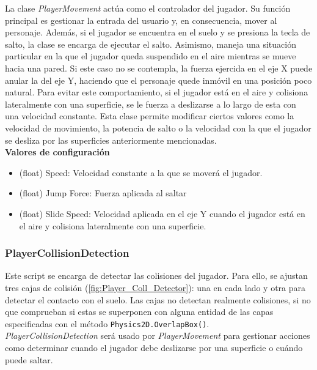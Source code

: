 La clase \textit{PlayerMovement} actúa como el controlador del jugador. Su función principal es gestionar la entrada del usuario y, en consecuencia, mover al personaje. Además, si el jugador se encuentra en el suelo y se presiona la tecla de salto, la clase se encarga de ejecutar el salto.
Asimismo, maneja una situación particular en la que el jugador queda suspendido en el aire mientras se mueve hacia una pared. Si este caso no se contempla, la fuerza ejercida en el eje X puede anular la del eje Y, haciendo que el personaje quede inmóvil en una posición poco natural. Para evitar este comportamiento, si el jugador está en el aire y colisiona lateralmente con una superficie, se le fuerza a deslizarse a lo largo de esta con una velocidad constante.
Esta clase permite modificar ciertos valores como la velocidad de movimiento, la potencia de salto o la velocidad con la que el jugador se desliza por las superficies anteriormente mencionadas.\\

\textbf{Valores de configuración}
\begin{itemize}
	\item (float) Speed: Velocidad constante a la que se moverá el jugador.
	\item (float) Jump Force: Fuerza aplicada al saltar
	\item (float) Slide Speed: Velocidad aplicada en el eje Y cuando el jugador está en el aire y colisiona lateralmente con una superficie.
\end{itemize}

\subsubsection{PlayerCollisionDetection}

Este script se encarga de detectar las colisiones del jugador. Para ello, se ajustan tres cajas de colisión (\autoref{fig:Player_Coll_Detector}): una en cada lado y otra para detectar el contacto con el suelo. Las cajas no detectan realmente colisiones, si no que comprueban si estas se superponen con alguna entidad de las capas especificadas con el método \texttt{Physics2D.OverlapBox()}.\\

\textit{PlayerCollisionDetection} será usado por \textit{PlayerMovement} para gestionar acciones como determinar cuando el jugador debe deslizarse por una superficie o cuándo puede saltar.\\

